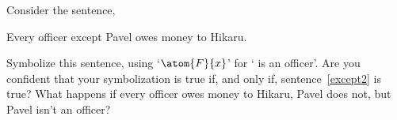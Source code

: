 
\problempart Consider the sentence,
\begin{earg}
	\item[\ex{except2}] Every officer except Pavel owes money to Hikaru.
\end{earg}
Symbolize this sentence, using `$\atom{F}{x}$' for ` is an officer'.  Are you confident that your symbolization is true if, and only if, sentence~\ref{except2} is true?  What happens if every officer owes money to Hikaru, Pavel does not, but Pavel isn't an officer? 

